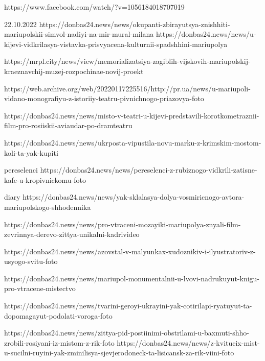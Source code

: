  
 
 
 
 

https://www.facebook.com/watch/?v=1056184018707019

22.10.2022
https://donbas24.news/news/okupanti-zbirayutsya-znishhiti-mariupolskii-simvol-nadiyi-na-mir-mural-milana
https://donbas24.news/news/u-kijevi-vidkrilasya-vistavka-prisvyacena-kulturnii-spadshhini-mariupolya

https://mrpl.city/news/view/memorializatsiya-zagiblih-vijskovih-mariupolskij-kraeznavchij-muzej-rozpochinae-novij-proekt

https://web.archive.org/web/20220117225516/http://pr.ua/news/u-mariupoli-vidano-monografiyu-z-istoriiy-teatru-pivnichnogo-priazovya-foto

https://donbas24.news/news/misto-v-teatri-u-kijevi-predstavili-korotkometraznii-film-pro-rosiiskii-aviaudar-po-dramteatru

https://donbas24.news/news/ukrposta-vipustila-novu-marku-z-krimskim-mostom-koli-ta-yak-kupiti

pereselenci
https://donbas24.news/news/pereselenci-z-rubiznogo-vidkrili-zatisne-kafe-u-kropivnickomu-foto

diary
https://donbas24.news/news/yak-sklalasya-dolya-vosmiricnogo-avtora-mariupolskogo-shhodennika

https://donbas24.news/news/pro-vtraceni-mozayiki-mariupolya-znyali-film-zevrinnya-derevo-zittya-unikalni-kadrivideo

https://donbas24.news/news/azovstal-v-malyunkax-xudoznikiv-i-ilyustratoriv-z-usyogo-svitu-foto

https://donbas24.news/news/mariupol-monumentalnii-u-lvovi-nadrukuyut-knigu-pro-vtracene-mistectvo

https://donbas24.news/news/tvarini-geroyi-ukrayini-yak-cotirilapi-ryatuyut-ta-dopomagayut-podolati-voroga-foto

https://donbas24.news/news/zittya-pid-postiinimi-obstrilami-u-baxmuti-shho-zrobili-rosiyani-iz-mistom-z-rik-foto
https://donbas24.news/news/z-kvitucix-mist-u-sucilni-ruyini-yak-zminilisya-sjevjerodoneck-ta-lisicansk-za-rik-viini-foto

